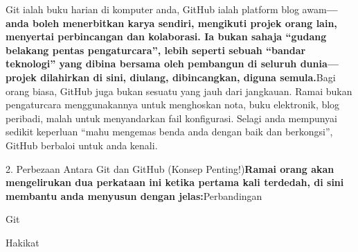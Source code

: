 


Git ialah buku harian di komputer anda, GitHub ialah platform blog awam\textbf{—anda boleh menerbitkan karya sendiri, mengikuti projek orang lain, menyertai perbincangan dan kolaborasi. Ia bukan sahaja “gudang belakang pentas pengaturcara”, lebih seperti sebuah “bandar teknologi” yang dibina bersama oleh pembangun di seluruh dunia—projek dilahirkan di sini, diulang, dibincangkan, diguna semula.}Bagi orang biasa, GitHub juga bukan sesuatu yang jauh dari jangkauan. Ramai bukan pengaturcara menggunakannya untuk menghoskan nota, buku elektronik, blog peribadi, malah untuk menyandarkan fail konfigurasi. Selagi anda mempunyai sedikit keperluan “mahu mengemas benda anda dengan baik dan berkongsi”, GitHub berbaloi untuk anda kenali.

2. Perbezaan Antara Git dan GitHub (Konsep Penting!)\textbf{Ramai orang akan mengelirukan dua perkataan ini ketika pertama kali terdedah, di sini membantu anda menyusun dengan jelas:}Perbandingan

Git


Hakikat

